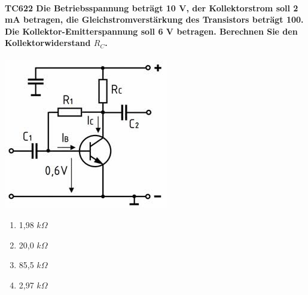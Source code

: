 \documentclass[8pt]{article}
\begin{document}
\begin{enumerate}
\begin{enumerate}[nolistsep,label=\Alph*]
{\begin{enumerate}[nolistsep,label=\Alph*]
\paragraph*{TC622 Die Betriebsspannung beträgt 10 V, der Kollektorstrom soll 2 mA betragen, die Gleichstromverstärkung des Transistors beträgt 100. Die Kollektor-Emitterspannung soll 6 V betragen. Berechnen Sie den Kollektorwiderstand $R_{C}$.}
\begin{center}
	\begin{minipage}{\linewidth}
		\centering
		\includegraphics[scale=1.0]{pics/tc622_a.jpg}
	\end{minipage}
\end{center}
\begin{enumerate}[nolistsep,label=\Alph*]
\item 1,98 $k\Omega$
\item 20,0 $k\Omega$
\item 85,5 $k\Omega$
\item 2,97 $k\Omega$
\end{enumerate}


\end{enumerate}}
\end{enumerate}
\end{enumerate}
\end{document}
